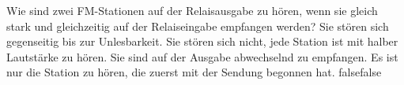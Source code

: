     {Wie sind zwei FM-Stationen auf der Relaisausgabe zu hören, wenn sie gleich stark und gleichzeitig auf der Relaiseingabe empfangen werden?}
    {Sie stören sich gegenseitig bis zur Unlesbarkeit.}
    {Sie stören sich nicht, jede Station ist mit halber Lautstärke zu hören.}
    {Sie sind auf der Ausgabe abwechselnd  zu empfangen.}
    {Es ist nur die Station zu hören, die zuerst mit der Sendung begonnen hat.}
    {false}{false}
